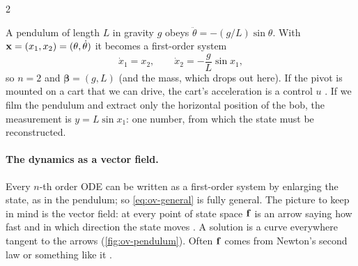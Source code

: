 \begin{paracol}{2}
\begin{example}\label{ex:ov-pendulum}
A pendulum of length $L$ in gravity $g$ obeys $\ddot\theta=-(g/L)\sin\theta$. With
$\mathbf{x}=(x_1,x_2)=(\theta,\dot\theta)$ it becomes a first-order system
\[
  \dot x_1=x_2,\qquad \dot x_2=-\frac{g}{L}\sin x_1 ,
\]
so $n=2$ and $\boldsymbol\beta=(g,L)$ (and the mass, which drops out here). If the pivot is mounted on
a cart that we can drive, the cart's acceleration is a control $u$ . If we film the
pendulum and extract only the horizontal position of the bob, the measurement is
$y=L\sin x_1$: one number, from which the state must be reconstructed.
\end{example}

\paragraph{The dynamics as a vector field.} Every $n$-th order ODE can be written as a first-order
system by enlarging the state, as in the pendulum; so \eqref{eq:ov-general} is fully general. The
picture to keep in mind is the vector field: at every point of state space $\mathbf{f}$ is an arrow
saying how fast and in which direction the state moves . A solution is a curve
everywhere tangent to the arrows (\cref{fig:ov-pendulum}). Often $\mathbf{f}$ comes from Newton's second
law or something like it .


\end{paracol}
